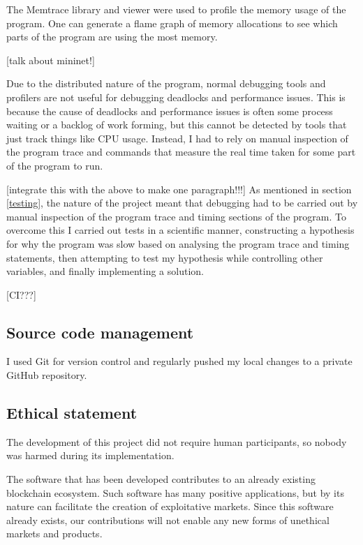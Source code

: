 The Memtrace library and viewer \cite{memtrace} were used to profile the memory usage of the program. One can generate a flame graph of memory allocations to see which parts of the program are using the most memory.

[talk about mininet!] \cite{mininet}

Due to the distributed nature of the program, normal debugging tools and profilers are not useful for debugging deadlocks and performance issues. This is because the cause of deadlocks and performance issues is often some process waiting or a backlog of work forming, but this cannot be detected by tools that just track things like CPU usage. Instead, I had to rely on manual inspection of the program trace and commands that measure the real time taken for some part of the program to run.

[integrate this with the above to make one paragraph!!!]
As mentioned in section \ref{testing}, the nature of the project meant that debugging had to be carried out by manual inspection of the program trace and timing sections of the program. To overcome this I carried out tests in a scientific manner, constructing a hypothesis for why the program was slow based on analysing the program trace and timing statements, then attempting to test my hypothesis while controlling other variables, and finally implementing a solution.

[CI???]

\subsection{Source code management}

I used Git for version control and regularly pushed my local changes to a private GitHub repository.

\subsection{Ethical statement}
The development of this project did not require human participants, so nobody was harmed during its implementation.

The software that has been developed contributes to an already existing blockchain ecosystem. Such software has many positive applications, but by its nature can facilitate the creation of exploitative markets. Since this software already exists, our contributions will not enable any new forms of unethical markets and products.